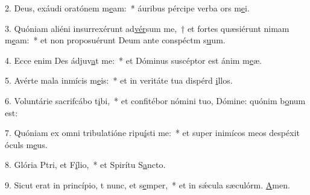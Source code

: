 2. Deus, exáudi oratónem m\uline{e}am:~* áuribus pércipe verba ors m\uline{e}i.\par 
3. Quóniam aliéni insurrexérunt ad\uline{vér}sum me,~† et fortes quæsiérunt nimam m\uline{e}am:~* et non proposuérunt Deum ante conspéctm s\uline{u}um.\par 
4. Ecce enim Des ádjuv\uline{a}t me:~* et Dóminus suscéptor est ánim m\uline{e}æ.\par 
5. Avérte mala inmícis m\uline{e}is:~* et in veritáte tua dispérd \uline{i}llos.\par 
6. Voluntárie sacrifcábo t\uline{i}bi,~* et confitébor nómini tuo, Dómine: quónim b\uline{o}num est:\par 
7. Quóniam ex omni tribulatióne ripu\uline{í}sti me:~* et super inimícos meos despéxit óculs m\uline{e}us.\par 
8. Glória Ptri, et F\uline{í}lio,~* et Spirítu S\uline{a}ncto.\par 
9. Sicut erat in princípio, t nunc, et s\uline{e}mper,~* et in sǽcula sæculórm. \uline{A}men.\par 
